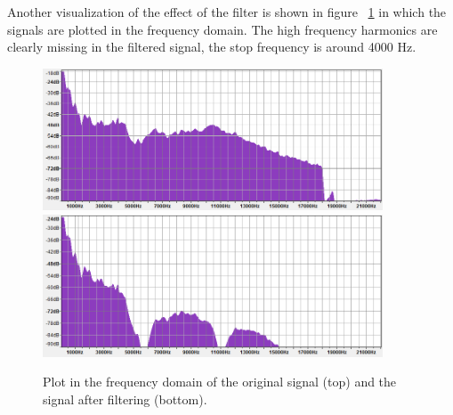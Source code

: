 Another visualization of the effect of the filter is shown in figure  ~\ref{fig:spectrum} in which the signals are plotted in the frequency domain. The high frequency harmonics are clearly missing in the filtered signal, the stop frequency is around 4000 Hz. 

\begin{figure}
\includegraphics[width=0.9\textwidth]{images/spectrum_input.png}
\includegraphics[width=0.9\textwidth]{images/spectrum_output.png}
\caption{Plot in the frequency domain of the original signal (top) and the signal after filtering (bottom).}
\label{fig:spectrum}
\end{figure}


\FloatBarrier
